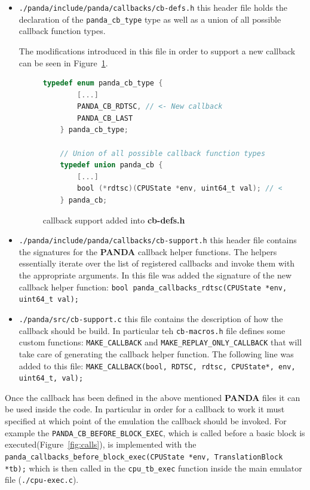 \begin{itemize}
    \item \lstinline{./panda/include/panda/callbacks/cb-defs.h} this header file holds the declaration of the \lstinline{panda_cb_type} type as well as a union of all possible callback function types.
    
    The modifications introduced in this file in order to support a new callback can be seen in Figure~\ref{fig:mod1}.
    
    \begin{figure}[htp!]
    \centering
    \begin{lstlisting}[language=C]
    typedef enum panda_cb_type {
        [...]
        PANDA_CB_RDTSC, // <- New callback
        PANDA_CB_LAST
    } panda_cb_type;
    
    // Union of all possible callback function types
    typedef union panda_cb {
        [...]
        bool (*rdtsc)(CPUState *env, uint64_t val); // <- New callback
    } panda_cb;
    \end{lstlisting}
    \caption{callback support added into \textbf{cb-defs.h}}
    \label{fig:mod1}
    \end{figure}
        
    \item \lstinline{./panda/include/panda/callbacks/cb-support.h} this header file contains the signatures for the \textbf{PANDA} callback helper functions. The helpers essentially iterate over the list of registered callbacks and invoke them with the appropriate arguments. In this file was added the signature of the new callback helper function: 
    \lstinline{bool panda_callbacks_rdtsc(CPUState *env, uint64_t val);}
    
    \item \lstinline{./panda/src/cb-support.c} this file contains the description of how the callback should be build. In particular teh \lstinline{cb-macros.h} file defines some custom functions: \lstinline{MAKE_CALLBACK} and \lstinline{MAKE_REPLAY_ONLY_CALLBACK} that will take care of generating the callback helper function. The following line was added to this file: \lstinline{MAKE_CALLBACK(bool, RDTSC, rdtsc, CPUState*, env, uint64_t, val);}
    
\end{itemize}

Once the callback has been defined in the above mentioned \textbf{PANDA} files it can be used inside the code. In particular in order for a callback to work it must specified at which point of the emulation the callback should be invoked. For example the \lstinline{PANDA_CB_BEFORE_BLOCK_EXEC}, which is called before a basic block is executed(Figure~\ref{fig:calls}), is implemented with the \lstinline{panda_callbacks_before_block_exec(CPUState *env, TranslationBlock *tb);} which is then called in the \lstinline{cpu_tb_exec} function inside the main emulator file (\lstinline{./cpu-exec.c}).

